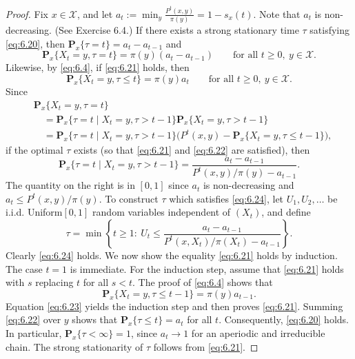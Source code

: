 \documentclass[11pt]{article}
\newcommand{\X}{\mathcal{X}}
\newcommand{\Px}{\mathbf{P}_x}
\begin{document}
\begin{proof}
Fix $x\in\X$, and let $a_t:=\min_y\frac{P^t(x,y)}{\pi(y)}=1-s_x(t)$.
Note that $a_t$ is non-decreasing. (See Exercise 6.4.) If there exists a
strong stationary time $\tau$ satisfying \eqref{eq:6.20}, then
$\Px\{\tau=t\}=a_t-a_{t-1}$ and
\begin{equation}
\Px\{X_t=y,\tau=t\}=\pi(y)(a_t-a_{t-1})
\qquad\text{for all }t\ge0,\ y\in\X.
\tag{6.21}\label{eq:6.21}
\end{equation}
Likewise, by \eqref{eq:6.4}, if \eqref{eq:6.21} holds, then
\begin{equation}
\Px\{X_t=y,\tau\le t\}=\pi(y)a_t
\qquad\text{for all }t\ge0,\ y\in\X.
\tag{6.22}\label{eq:6.22}
\end{equation}
Since
\begin{equation}
\begin{aligned}
&\Px\{X_t=y,\tau=t\}\\
&\quad=\Px\{\tau=t\mid X_t=y,\tau>t-1\}\Px\{X_t=y,\tau>t-1\}\\
&\quad=\Px\{\tau=t\mid X_t=y,\tau>t-1\}
 \big(P^t(x,y)-\Px\{X_t=y,\tau\le t-1\}\big),
\end{aligned}
\tag{6.23}\label{eq:6.23}
\end{equation}
if the optimal $\tau$ exists (so that \eqref{eq:6.21} and
\eqref{eq:6.22} are satisfied), then
\begin{equation}
\Px\{\tau=t\mid X_t=y,\tau>t-1\}
 =\frac{a_t-a_{t-1}}{P^t(x,y)/\pi(y)-a_{t-1}}.
\tag{6.24}\label{eq:6.24}
\end{equation}
The quantity on the right is in $[0,1]$ since $a_t$ is non-decreasing and
$a_t\le P^t(x,y)/\pi(y)$. To construct $\tau$ which satisfies
\eqref{eq:6.24}, let $U_1,U_2,\ldots$ be i.i.d. Uniform$[0,1]$ random
variables independent of $(X_t)$, and define
\[
\tau=\min\left\{t\ge1:\ U_t\le
\frac{a_t-a_{t-1}}{P^t(x,X_t)/\pi(X_t)-a_{t-1}}\right\}.
\]
Clearly \eqref{eq:6.24} holds. We now show the equality
\eqref{eq:6.21} holds by induction. The case $t=1$ is immediate.
For the induction step, assume that \eqref{eq:6.21} holds with $s$
replacing $t$ for all $s<t$. The proof of \eqref{eq:6.4} shows that
\[
\Px\{X_t=y,\tau\le t-1\}=\pi(y)a_{t-1}.
\]
Equation \eqref{eq:6.23} yields the induction step and then proves
\eqref{eq:6.21}. Summing \eqref{eq:6.22} over $y$ shows that
$\Px\{\tau\le t\}=a_t$ for all $t$. Consequently, \eqref{eq:6.20}
holds. In particular, $\Px\{\tau<\infty\}=1$, since $a_t\to1$ for an
aperiodic and irreducible chain. The strong stationarity of $\tau$ follows
from \eqref{eq:6.21}.
\end{proof}
\end{document}
